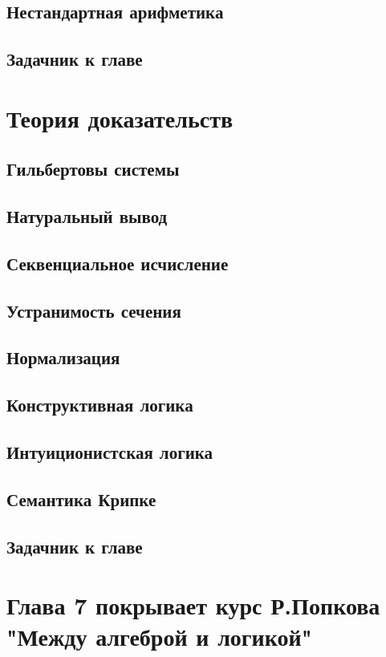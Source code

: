 \documentclass[12pt,a4paper,oneside,openany]{book}
\theoremstyle{definition}
\theoremstyle{plain}
\theoremstyle{remark}
\begin{document}
\section{Нестандартная арифметика}

\section{Задачник к главе}


\chapter{Теория доказательств}

\section{Гильбертовы системы}
\section{Натуральный вывод}
\section{Секвенциальное исчисление}
\section{Устранимость сечения}
\section{Нормализация}
\section{Конструктивная логика}
\section{Интуиционистская логика}
\section{Семантика Крипке}

\section{Задачник к главе}

\chapter*{Глава 7 покрывает курс Р.Попкова "Между алгеброй и логикой"}
\end{document}
